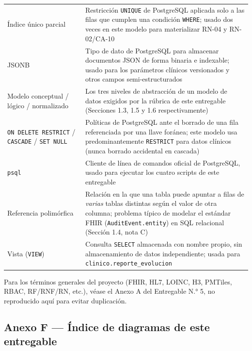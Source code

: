 \documentclass[11pt,a4paper]{article}
\begin{document}
{\begin{longtable}[]{@{}
  >{\raggedright\arraybackslash}p{}
  >{\raggedright\arraybackslash}p{}@{}}
Índice único parcial & Restricción \texttt{UNIQUE} de PostgreSQL aplicada solo a las filas que cumplen una condición \texttt{WHERE}; usado dos veces en este modelo para materializar RN-04 y RN-02/CA-10 \\
JSONB & Tipo de dato de PostgreSQL para almacenar documentos JSON de forma binaria e indexable; usado para los parámetros clínicos versionados y otros campos semi-estructurados \\
Modelo conceptual / lógico / normalizado & Los tres niveles de abstracción de un modelo de datos exigidos por la rúbrica de este entregable (Secciones 1.3, 1.5 y 1.6 respectivamente) \\
\texttt{ON\ DELETE\ RESTRICT} / \texttt{CASCADE} / \texttt{SET\ NULL} & Políticas de PostgreSQL ante el borrado de una fila referenciada por una llave foránea; este modelo usa predominantemente \texttt{RESTRICT} para datos clínicos (nunca borrado accidental en cascada) \\
\texttt{psql} & Cliente de línea de comandos oficial de PostgreSQL, usado para ejecutar los cuatro scripts de este entregable \\
Referencia polimórfica & Relación en la que una tabla puede apuntar a filas de \emph{varias} tablas distintas según el valor de otra columna; problema típico de modelar el estándar FHIR (\texttt{AuditEvent.entity}) en SQL relacional (Sección 1.4, nota C) \\
Vista (\texttt{VIEW}) & Consulta \texttt{SELECT} almacenada con nombre propio, sin almacenamiento de datos independiente; usada para \texttt{clinico.reporte\_evolucion} \\
\end{longtable}
}

Para los términos generales del proyecto (FHIR, HL7, LOINC, H3, PMTiles, RBAC, RF/RNF/RN, etc.), véase el Anexo A del Entregable N.° 5, no reproducido aquí para evitar duplicación.

\subsection{Anexo F --- Índice de diagramas de este entregable}\label{anexo-f-uxedndice-de-diagramas-de-este-entregable}
\end{document}
